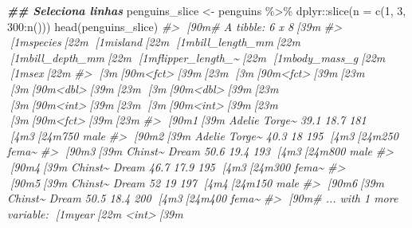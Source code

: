 \documentclass[
]{book}
\newenvironment{Shaded}{\begin{snugshade}}{\end{snugshade}}
\newcommand{\AttributeTok}[1]{\textcolor[rgb]{0.61,0.61,0.61}{#1}}
\newcommand{\CommentTok}[1]{\textcolor[rgb]{0.37,0.37,0.37}{\textit{#1}}}
\newcommand{\DecValTok}[1]{\textcolor[rgb]{0.06,0.06,0.06}{#1}}
\newcommand{\DocumentationTok}[1]{\textcolor[rgb]{0.37,0.37,0.37}{\textbf{\textit{#1}}}}
\newcommand{\FunctionTok}[1]{\textcolor[rgb]{0,0,0}{#1}}
\newcommand{\NormalTok}[1]{#1}
\newcommand{\OtherTok}[1]{\textcolor[rgb]{0.37,0.37,0.37}{#1}}
\newcommand{\SpecialCharTok}[1]{\textcolor[rgb]{0,0,0}{#1}}
\begin{document}
\begin{Shaded}
\begin{Highlighting}[]
\DocumentationTok{\#\# Seleciona linhas}
\NormalTok{penguins\_slice }\OtherTok{\textless{}{-}}\NormalTok{ penguins }\SpecialCharTok{\%\textgreater{}\%} 
\NormalTok{  dplyr}\SpecialCharTok{::}\FunctionTok{slice}\NormalTok{(}\AttributeTok{n =} \FunctionTok{c}\NormalTok{(}\DecValTok{1}\NormalTok{, }\DecValTok{3}\NormalTok{, }\DecValTok{300}\SpecialCharTok{:}\FunctionTok{n}\NormalTok{()))}
\FunctionTok{head}\NormalTok{(penguins\_slice)}
\CommentTok{\#\textgreater{} [90m\# A tibble: 6 x 8[39m}
\CommentTok{\#\textgreater{}   [1mspecies[22m [1misland[22m [1mbill\_length\_mm[22m [1mbill\_depth\_mm[22m [1mflipper\_length\_\textasciitilde{}[22m [1mbody\_mass\_g[22m [1msex[22m  }
\CommentTok{\#\textgreater{}   [3m[90m\textless{}fct\textgreater{}[39m[23m   [3m[90m\textless{}fct\textgreater{}[39m[23m           [3m[90m\textless{}dbl\textgreater{}[39m[23m         [3m[90m\textless{}dbl\textgreater{}[39m[23m            [3m[90m\textless{}int\textgreater{}[39m[23m       [3m[90m\textless{}int\textgreater{}[39m[23m [3m[90m\textless{}fct\textgreater{}[39m[23m}
\CommentTok{\#\textgreater{} [90m1[39m Adelie  Torge\textasciitilde{}           39.1          18.7              181        [4m3[24m750 male }
\CommentTok{\#\textgreater{} [90m2[39m Adelie  Torge\textasciitilde{}           40.3          18                195        [4m3[24m250 fema\textasciitilde{}}
\CommentTok{\#\textgreater{} [90m3[39m Chinst\textasciitilde{} Dream            50.6          19.4              193        [4m3[24m800 male }
\CommentTok{\#\textgreater{} [90m4[39m Chinst\textasciitilde{} Dream            46.7          17.9              195        [4m3[24m300 fema\textasciitilde{}}
\CommentTok{\#\textgreater{} [90m5[39m Chinst\textasciitilde{} Dream            52            19                197        [4m4[24m150 male }
\CommentTok{\#\textgreater{} [90m6[39m Chinst\textasciitilde{} Dream            50.5          18.4              200        [4m3[24m400 fema\textasciitilde{}}
\CommentTok{\#\textgreater{} [90m\# ... with 1 more variable: [1myear[22m \textless{}int\textgreater{}[39m}


\end{Highlighting}
\end{Shaded}
\end{document}

